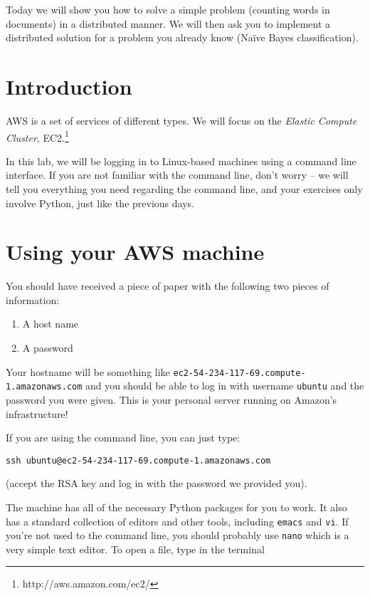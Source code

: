 Today we will show you how to solve a simple problem (counting words in
documents) in a distributed manner. We will then ask you to implement a
distributed solution for a problem you already know (Na\"{i}ve Bayes
classification).

\section{Introduction}

AWS is a set of services of different types. We will focus on the \emph{Elastic
Compute Cluster}, EC2.\footnote{http://aws.amazon.com/ec2/}

In this lab, we will be logging in to Linux-based machines using a command line
interface. If you are not familiar with the command line, don't worry -- we
will tell you everything you need regarding the command line, and your
exercises only involve Python, just like the previous days.

\section{Using your AWS machine}

You should have received a piece of paper with the following two pieces of information:

\begin{enumerate}
\item A host name
\item A password
\end{enumerate}

Your hostname will be
something like \texttt{ec2-54-234-117-69.compute-1.amazonaws.com} and you
should be able to log in with username \texttt{ubuntu} and the password you
were given. This is your personal server running on Amazon's infrastructure!

If you are using the command line, you can just type:

\begin{verbatim}
ssh ubuntu@ec2-54-234-117-69.compute-1.amazonaws.com
\end{verbatim}
(accept the RSA key and log in with the password we provided you).

The machine has all of the necessary Python packages for you to work. It also
has a standard collection of editors and other tools, including \texttt{emacs} and \texttt{vi}. If you're not used to the command line, you should probably use \texttt{nano} which is a very simple text editor. To open a file, type in the terminal

